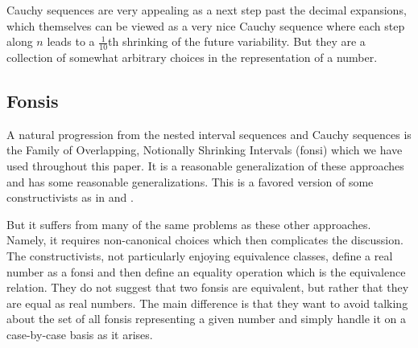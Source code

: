 \documentclass[12pt]{article}
\begin{document}
Cauchy sequences are very appealing as a next step past the decimal expansions, which themselves can be viewed as a very nice Cauchy sequence where each step along $n$ leads to a $\frac{1}{10}$th shrinking of the future variability. But they are a collection of somewhat arbitrary choices in the representation of a number. 

\subsection{Fonsis}

A natural progression from the nested interval sequences and Cauchy sequences is the Family of Overlapping, Notionally Shrinking Intervals (fonsi) which we have used throughout this paper. It is a reasonable generalization of these approaches and has some reasonable generalizations. This is a favored version of some constructivists as in \cite{bridger} and \cite{bridges}. 

But it suffers from many of the same problems as these other approaches. Namely, it requires non-canonical choices which then complicates the discussion. The constructivists, not particularly enjoying equivalence classes, define a real number as a fonsi and then define an equality operation which is the equivalence relation. They do not suggest that two fonsis are equivalent, but rather that they are equal as real numbers. The main difference is that they want to avoid talking about the set of all fonsis representing a given number and simply handle it on a case-by-case basis as it arises. 
\end{document}
